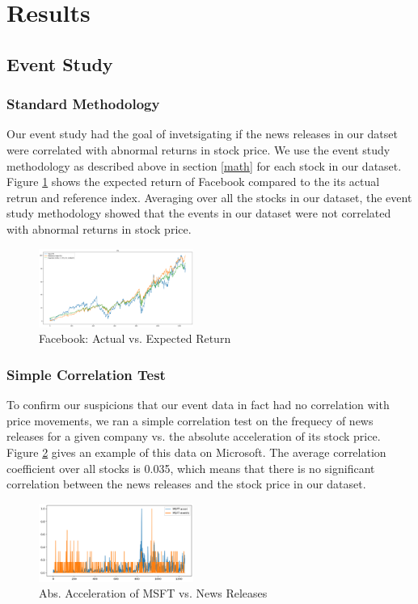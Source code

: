 \documentclass[conference]{IEEEtran}
\begin{document}
\section{Results}
\subsection{Event Study}
\subsubsection{Standard Methodology}
Our event study had the goal of invetsigating if the news releases in our datset were correlated with abnormal returns in stock price. We use the event study methodology as described above in section \ref{math} for each stock in our dataset. Figure \ref{fig:expected} shows the expected return of Facebook compared to the its actual retrun and reference index. Averaging over all the stocks in our dataset, the event study methodology showed that the events in our dataset were not correlated with abnormal returns in stock price.
\begin{figure}[ht]
	\centering
	\includegraphics[width=0.45\textwidth]{FBExpectedValues.png}
	\caption{Facebook: Actual vs. Expected Return}
	\label{fig:expected}
\end{figure} 
\subsubsection{Simple Correlation Test}
To confirm our suspicions that our event data in fact had no correlation with price movements, we ran a simple correlation test on the frequecy of news releases for a given company vs. the absolute acceleration of its stock price. Figure \ref{fig:acceleartion} gives an example of this data on Microsoft. The average correlation coefficient over all stocks is 0.035, which means that there is no significant correlation between the news releases and the stock price in our dataset.
\begin{figure}[ht]
	\centering
	\includegraphics[width=0.45\textwidth]{MSFTevents.png}
	\caption{Abs. Acceleration of MSFT vs. News Releases}
	\label{fig:acceleartion}
\end{figure}
\end{document}
